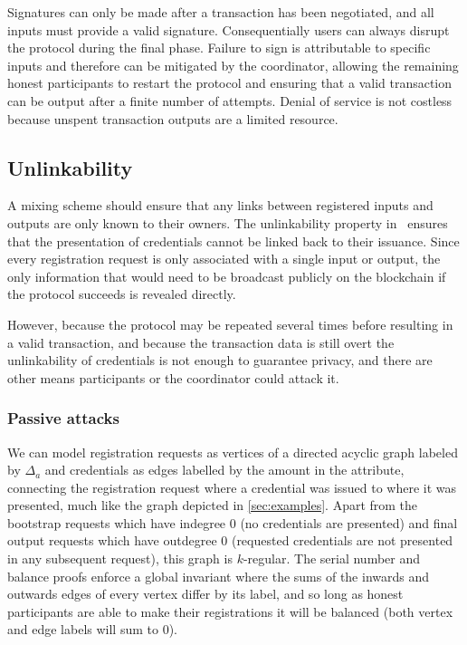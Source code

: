 \documentclass[a4paper]{article}
\begin{document}
Signatures can only be made after a transaction has been negotiated, and all inputs must provide a valid signature. Consequentially users can always disrupt the protocol during the final phase. Failure to sign is attributable to specific inputs and therefore can be mitigated by the coordinator, allowing the remaining honest participants to restart the protocol and ensuring that a valid transaction can be output after a finite number of attempts. Denial of service is not costless because unspent transaction outputs are a limited resource.

\subsection{Unlinkability}

A mixing scheme should ensure that any links between registered inputs and outputs are only known to their owners. The unlinkability property in~\cite{chase2019signal} ensures that the presentation of credentials cannot be linked back to their issuance. Since every registration request is only associated with a single input or output, the only information that would need to be broadcast publicly on the blockchain if the protocol succeeds is revealed directly.

However, because the protocol may be repeated several times before resulting in a valid transaction, and because the transaction data is still overt the unlinkability of credentials is not enough to guarantee privacy, and there are other means participants or the coordinator could attack it.

\subsubsection{Passive attacks}

We can model registration requests as vertices of a directed acyclic graph labeled by $\Delta_a$ and credentials as edges labelled by the amount in the attribute, connecting the registration request where a credential was issued to where it was presented, much like the graph depicted in \cref{sec:examples}. Apart from the bootstrap requests which have indegree 0 (no credentials are presented) and final output requests which have outdegree 0 (requested credentials are not presented in any subsequent request), this graph is $k$-regular. The serial number and balance proofs enforce a global invariant where the sums of the inwards and outwards edges of every vertex differ by its label, and so long as honest participants are able to make their registrations it will be balanced (both vertex and edge labels will sum to 0).
\end{document}

